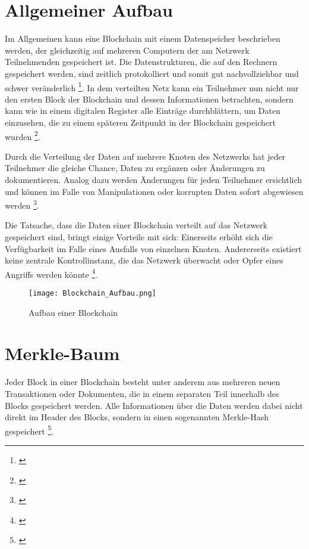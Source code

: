 \section{Allgemeiner Aufbau}\label{sec:allgemeiner-aufbau}
Im Allgemeinen kann eine Blockchain mit einem Datenspeicher beschrieben werden, der gleichzeitig auf mehreren Computern der am Netzwerk Teilnehmenden gespeichert ist. Die Datenstrukturen, die auf den Rechnern gespeichert werden, sind zeitlich protokolliert und somit gut nachvollziehbar und schwer veränderlich \footnote{\parencite[vgl.][]{BaFin.25.10.2021}}.
In dem verteilten Netz kann ein Teilnehmer nun nicht nur den ersten Block der Blockchain und dessen Informationen betrachten, sondern kann wie in einem digitalen Register alle Einträge durchblättern, um Daten einzusehen, die zu einem späteren Zeitpunkt in der Blockchain gespeichert wurden \footnote{\parencite[vgl.][S. 18]{Fill.2020}}.

Durch die Verteilung der Daten auf mehrere Knoten des Netzwerks hat jeder Teilnehmer die gleiche Chance, Daten zu ergänzen oder Änderungen zu dokumentieren. Analog dazu werden Änderungen für jeden Teilnehmer ersichtlich und können im Falle von Manipulationen oder korrupten Daten sofort abgewiesen werden \footnote{\parencite[vgl][]{BaFin.25.10.2021}}.

Die Tatsache, dass die Daten einer Blockchain verteilt auf das Netzwerk gespeichert sind, bringt einige Vorteile mit sich: Einerseits erhöht sich die Verfügbarkeit im Falle eines Ausfalls von einzelnen Knoten. Andererseits existiert keine zentrale Kontrollinstanz, die das Netzwerk überwacht oder Opfer eines Angriffs werden könnte \footnote{\parencite[vgl][]{BaFin.25.10.2021}}.

\begin{figure}[h]
    \begin{centering}
        \texttt{[image: Blockchain\_Aufbau.png]}
        \caption{Aufbau einer Blockchain}
        \label{fig:blockchain-aufbau}
    \end{centering}
\end{figure}



\section{Merkle-Baum}\label{sec:merkle-baum}
Jeder Block in einer Blockchain besteht unter anderem aus mehreren neuen Transaktionen oder Dokumenten, die in einem separaten Teil innerhalb des Blocks gespeichert werden. Alle Informationen über die Daten werden dabei nicht direkt im Header des Blocks, sondern in einen sogenannten Merkle-Hash gespeichert \footnote{\parencite[vgl.][S. 137]{Bruhl.2017}}.

